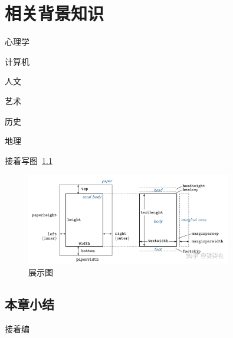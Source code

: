 \chapter{相关背景知识}
\label{ch:related}

心理学

计算机

人文

艺术

历史

地理

接着写图~\ref{fig:geometry}

\begin{figure}[t]
    \centering
    \includegraphics[width=0.8\textwidth]{fig/geometry.jpg}
    \caption{展示图}
    \label{fig:geometry}
\end{figure}

\section{本章小结}

接着编